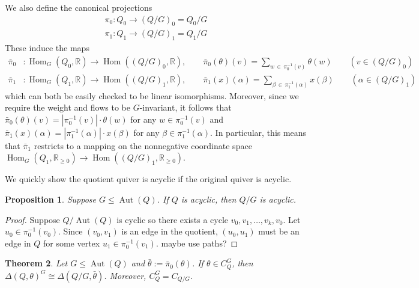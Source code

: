 \documentclass[11pt]{amsart}
\theoremstyle{plain}
\newtheorem{theorem}{Theorem}[section]
\newtheorem{proposition}[theorem]{Proposition}
\theoremstyle{definition}
\newcommand{\R}{\mathbb{R}}
\DeclareMathOperator{\aut}{Aut}
\DeclareMathOperator{\Hom}{Hom}
\renewcommand{\hom}{\Hom}
\begin{document}
We also define the canonical projections 
\begin{align*}
    \pi_0 : Q_0 \longrightarrow (Q/G)_0 = Q_0/G \\
    \pi_1 : Q_1 \longrightarrow (Q/G)_1 = Q_1/G
\end{align*}
These induce the maps 
\begin{align*}
    \bar \pi_0 &: \hom_G(Q_0, \R) \longrightarrow \hom((Q/G)_0, \R), \qquad \bar\pi_0(\theta)(v) = \sum_{w \,\in\, \pi_0^{-1}(v)}\theta(w) \qquad (v \in (Q/G)_0) \\
    \bar\pi_1 &: \hom_G(Q_1, \R) \longrightarrow \hom((Q/G)_1, \R), \qquad \bar\pi_1(x)(\alpha) = \sum_{\beta \,\in\, \pi_1^{-1}(\alpha)}x(\beta) \qquad (\alpha \in (Q/G)_1)
\end{align*}
which can both be easily checked to be linear isomorphisms. Moreover, since we require the weight and flows to be $G$-invariant, it follows that $\bar \pi_0(\theta)(v) = |\pi_0^{-1}(v)| \cdot \theta(w)$ for any $w \in \pi_0^{-1}(v)$ and $\bar\pi_1(x)(\alpha) = |\pi_1^{-1}(\alpha)| \cdot x(\beta)$ for any $\beta \in \pi_1^{-1}(\alpha)$. In particular, this means that $\bar\pi_1$ restricts to a mapping on the nonnegative coordinate space $\hom_G(Q_1, \R_{\geq 0}) \longrightarrow \hom((Q/G)_1, \R_{\geq 0})$.

We quickly show the quotient quiver is  acyclic if the original quiver is acyclic.

\begin{proposition}
    Suppose $G \leq \aut(Q)$. If $Q$ is acyclic, then $Q/G$ is acyclic.
\end{proposition}

\begin{proof}
    Suppose $Q/\aut(Q)$ is cyclic so there exists a cycle $v_0, v_1, \ldots, v_k, v_0$. Let $u_0 \in \pi^{-1}_0(v_0)$. Since $(v_0, v_1)$ is an edge in the quotient, $(u_0, u_1)$ must be an edge in $Q$ for some vertex $u_1 \in \pi_0^{-1}(v_1)$.  maybe use paths?     
\end{proof}

\begin{theorem} \label{quotient-graph-correspondence}
    Let $G \leq \aut(Q)$ and $\bar\theta := \bar\pi_0(\theta)$. If $\theta \in C_Q^G$, then $\Delta(Q, \theta)^G \cong \Delta(Q/G, \bar{\theta})$. Moreover, $C_Q^G = C_{Q/G}$.
\end{theorem}
\end{document}
